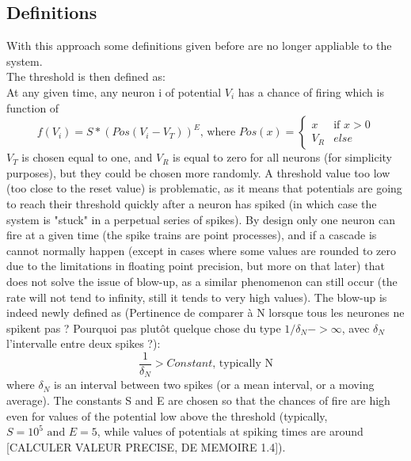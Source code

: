 \subsection{Definitions}
	With this approach some definitions given before are no longer appliable to the system.\\
	The threshold is then defined as:\\
		At any given time, any neuron i of potential $V_i$ has a chance of firing which is function of
		\[
			f(V_i)=S*(Pos(V_i-V_T))^E\text{, where }Pos(x)=\begin{cases}x & \text{if }x>0\\V_R & else\end{cases}
		\]
	$V_T$ is chosen equal to one, and $V_R$ is equal to zero for all neurons (for simplicity purposes), but they could be chosen more randomly. A threshold value too low (too close to the reset value) is problematic, as it means that potentials are going to reach their threshold quickly after a neuron has spiked (in which case the system is "stuck" in a perpetual series of spikes). By design only one neuron can fire at a given time (the spike trains are point processes), and if a cascade is cannot normally happen (except in cases where some values are rounded to zero due to the limitations in floating point precision, but more on that later) that does not solve the issue of blow-up, as a similar phenomenon can still occur (the rate will not tend to infinity, still it tends to very high values). The blow-up is indeed newly defined as (Pertinence de comparer \`a N lorsque tous les neurones ne spikent pas ? Pourquoi pas plut\^ot quelque chose du type $1/\delta_N->\infty$, avec $\delta_N$ l'intervalle entre deux spikes ?):
	\[
		\frac{1}{\delta_N}>Constant\text{, typically N}
	\]
	where $\delta_N$ is an interval between two spikes (or a mean interval, or a moving average). The constants S and E are chosen so that the chances of fire are high even for values of the potential low above the threshold (typically, $S=10^5\text{ and }E=5$, while values of potentials at spiking times are around [CALCULER VALEUR PRECISE, DE MEMOIRE 1.4]).

